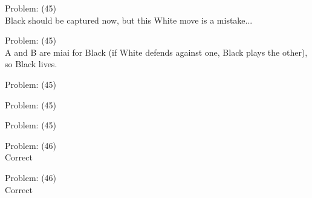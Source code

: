 \documentclass[11pt]{article}
\begin{document}
\begin{minipage}[t]{0.5\textwidth}
  {\centering
  
  Problem: (45)\\
  Black should be captured now, but this White move is a mistake...\\
  }
\end{minipage}
\begin{minipage}[t]{0.5\textwidth}
  {\centering
  
  Problem: (45)\\
  A and B are miai for Black (if White defends against one, Black plays the other), so Black lives.\\
  }
\end{minipage}
\begin{minipage}[t]{0.5\textwidth}
  {\centering
  
  Problem: (45)\\
  
  }
\end{minipage}
\begin{minipage}[t]{0.5\textwidth}
  {\centering
  
  Problem: (45)\\
  
  }
\end{minipage}
\begin{minipage}[t]{0.5\textwidth}
  {\centering
  
  Problem: (45)\\
  
  }
\end{minipage}
\begin{minipage}[t]{0.5\textwidth}
  {\centering
  
  Problem: (46)\\
  Correct\\
  }
\end{minipage}
\begin{minipage}[t]{0.5\textwidth}
  {\centering
  
  Problem: (46)\\
  Correct\\
  }
\end{minipage}
\end{document}
